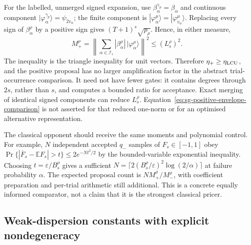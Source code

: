 For the labelled, unmerged signed expansion,
use $\beta_\alpha^{\gamma_p}=\beta_\alpha$ and continuous component
$|\varphi_\alpha^{\gamma_p}\rangle=\psi_{2v_\alpha}$; the finite
component is $|\varphi_\alpha^\mu\rangle=
|\varphi_{v_\alpha}^\mu\rangle$.
Replacing every sign of $\beta_\alpha^\rho$ by a positive sign gives
$(T+1)^s\sqrt{p_\rho}$. Hence, in either measure,
\begin{equation}
 M_+^\rho=
   \left\|\sum_{\alpha\in\mathcal I_s}
             |\beta_\alpha^\rho|\,|\varphi_\alpha^\rho\rangle\right\|^2
       \leq (L_s^\rho)^2.
 \label{eq:sg-positive-envelope-comparison}
\end{equation}
The inequality is the triangle inequality for unit vectors.
Therefore $\eta_+\geq\eta_{\rm LCU}$, and the positive proposal has
no larger amplification factor in the abstract trial-occurrence
comparison. It need not have fewer gates: it contains degrees through
$2s$, rather than $s$, and computes a bounded ratio for acceptance.
Exact merging of identical signed components can reduce $L_s^\rho$.
Equation~\eqref{eq:sg-positive-envelope-comparison} is not asserted for
that reduced one-norm or for an optimised alternative representation.

The classical opponent should receive the same moments and polynomial
control. For example, $N$ independent accepted $q_-$ samples of
$F_s\in[-1,1]$ obey
$\Pr\{|\overline F_s-\mathbb E F_s|>t\}\leq
2e^{-Nt^2/2}$ by the bounded-variable exponential inequality.
Choosing $t=\varepsilon/B_s^\rho$ gives a sufficient
$N=\lceil2(B_s^\rho/\varepsilon)^2\log(2/\alpha)\rceil$
at failure probability $\alpha$.
The expected proposal count is $NM_+^\rho/M_-^\rho$, with
coefficient preparation and per-trial arithmetic still additional.
This is a concrete equally informed comparator, not a claim that
it is the strongest classical pricer.

\subsection{Weak-dispersion constants with explicit nondegeneracy}

